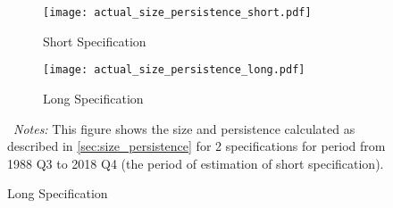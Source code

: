 \documentclass[11pt]{article}
\begin{document}
\begin{figure}[!hpbt]\centering
  \begin{minipage}{\textwidth}\centering
    \caption{Historical Estimates of Size and Persistence} 
    \label{fig:size_persistence}
    \vspace{1ex}
    \begin{subfigure}[b]{0.494\textwidth}\centering
      \caption{Short Specification}
      \texttt{[image: actual\_size\_persistence\_short.pdf]}
    \end{subfigure}\hfill
    \begin{subfigure}[b]{0.494\textwidth}\centering
      \caption{Long Specification}
      \texttt{[image: actual\_size\_persistence\_long.pdf]}
    \end{subfigure}
    {\begin{flushleft}\scriptsize ~\textit{Notes:} This figure shows the size and persistence calculated as described in \vref{sec:size_persistence} for 2 specifications for period from 1988 Q3 to 2018 Q4 (the period of estimation of short specification).\end{flushleft}} 
    \end{minipage}
    
\end{figure}
\end{document}
